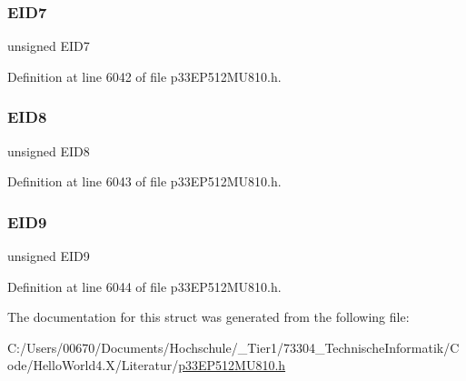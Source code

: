 \subsubsection{\texorpdfstring{E\+I\+D7}{EID7}}
{\footnotesize\ttfamily unsigned E\+I\+D7}



Definition at line 6042 of file p33\+E\+P512\+M\+U810.\+h.

\mbox{\label{structtag_c2_r_x_m1_e_i_d_b_i_t_s_acca25e0b7d86eb499d01f85222baea87}} 
\subsubsection{\texorpdfstring{E\+I\+D8}{EID8}}
{\footnotesize\ttfamily unsigned E\+I\+D8}



Definition at line 6043 of file p33\+E\+P512\+M\+U810.\+h.

\mbox{\label{structtag_c2_r_x_m1_e_i_d_b_i_t_s_ac6748f73d4ada8538b06548be4f396c2}} 
\subsubsection{\texorpdfstring{E\+I\+D9}{EID9}}
{\footnotesize\ttfamily unsigned E\+I\+D9}



Definition at line 6044 of file p33\+E\+P512\+M\+U810.\+h.



The documentation for this struct was generated from the following file\+:\begin{DoxyCompactItemize}
\item 
C\+:/\+Users/00670/\+Documents/\+Hochschule/\+\_\+\+Tier1/73304\+\_\+\+Technische\+Informatik/\+Code/\+Hello\+World4.\+X/\+Literatur/\hyperlink{p33_e_p512_m_u810_8h}{p33\+E\+P512\+M\+U810.\+h}\end{DoxyCompactItemize}
